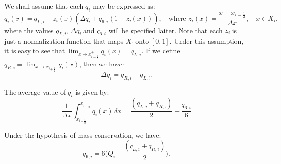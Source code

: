 We shall assume that each $q_i$ may be expressed as:
\begin{equation}
	\label{chp2-sec-recon-ppm-eq1}
	q_i(x) = q_{L, i} + z_i(x)(\Delta q_i + q_{6, i}(1-z_i(x))), 
	\quad \text{where }
	z_i(x) = \frac{x-x_{i-\frac{1}{2}}}{\Delta x},
	\quad x \in X_i,
\end{equation}
where the values $q_{L, i}$, $\Delta q_i$ and $q_{6, i}$  will be specified latter.
Note that each $z_i$ is just a normalization function that maps $X_i$ onto $[0,1]$.
Under this assumption, it is easy to see that 
$\lim_{x \to x_{i-\frac{1}{2}}^+} {q_i(x)} = q_{L, i}$.
If we define $q_{R, i} = \lim_{x \to x_{i+\frac{1}{2}}^-} {q_i(x)}$,
then we have:
\begin{equation}
	\label{chp2-sec-recon-ppm-eq2}
	\Delta q_i = q_{R, i} - q_{L, i}.
\end{equation}

The average value of $q_i$ is given by:
\begin{equation}
	\label{chp2-sec-recon-ppm-eq3}
	\frac{1}{\Delta x}\int_{x_{i-\frac{1}{2}}}^{x_{i+\frac{1}{2}}} {q}_i(x) \,dx
	= \frac{(q_{L,i} + q_{R,i})}{2} + \frac{q_{6,i}}{6}
\end{equation}

Under the hypothesis of mass conservation, we have:
\begin{equation}
	\label{chp2-sec-recon-ppm-eq4}
	q_{6,i} = 6\bigg(Q_i - \frac{(q_{L,i} + q_{R,i})}{2}\bigg).
\end{equation}

